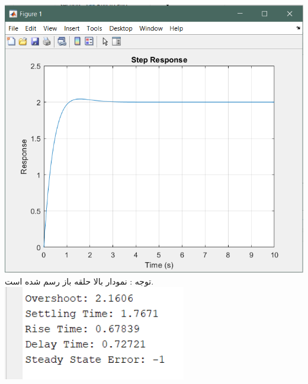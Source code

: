 \documentclass[a4,12pt]{article}
\begin{document}
{{         	\includegraphics[width=15cm]{Q5_step.png}  \\
         	 توجه : نمودار بالا حلقه باز رسم شده است.\\
         	\includegraphics[width=8cm]{output_b.png} 
         }
}
\end{document}
